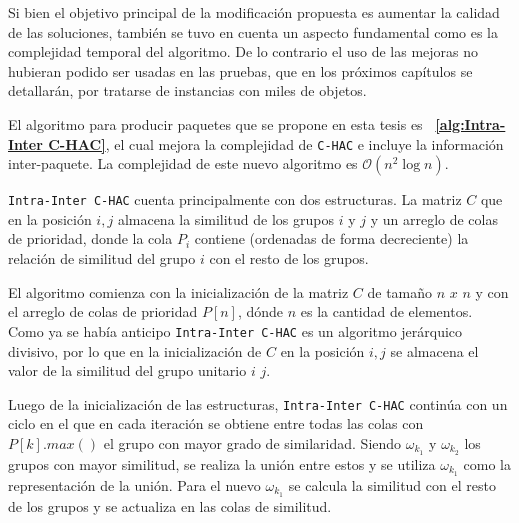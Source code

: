 Si bien el objetivo principal de la modificación propuesta es aumentar la calidad de las soluciones, también se tuvo en cuenta un aspecto fundamental como es la complejidad temporal del algoritmo. De lo contrario el uso de las mejoras no hubieran podido ser usadas en las pruebas, que en los próximos capítulos se detallarán, por tratarse de instancias con miles de objetos.

El algoritmo para producir paquetes que se propone en esta tesis es \textbf{~\autoref{alg:Intra-Inter C-HAC}}, el cual mejora la complejidad de  \texttt{C-HAC} e incluye la información inter-paquete. La complejidad de este nuevo algoritmo es $\mathcal{O}(n^{2}\log n)$. 

\texttt{Intra-Inter C-HAC} cuenta principalmente con dos estructuras. La matriz $C$ que en la posición $i,j$ almacena la similitud de los grupos $i$ y $j$ y un arreglo de colas de prioridad, donde la cola $P_i$ contiene (ordenadas de forma decreciente) la relación de similitud del grupo $i$ con el resto de los grupos.

El algoritmo comienza con la inicialización de la matriz $C$ de tamaño $n$ $x$ $n$ y con el arreglo de colas de prioridad $P\left[n\right]$, dónde $n$ es la cantidad de elementos. Como ya se había anticipo \texttt{Intra-Inter C-HAC} es un algoritmo jerárquico divisivo, por lo que en la inicialización de $C$ en la posición $i,j$ se almacena el valor de la similitud del grupo unitario $i$ $j$.

Luego de la inicialización de las estructuras, \texttt{Intra-Inter C-HAC} continúa con un ciclo en el que en cada iteración se obtiene entre todas las colas con $P\left[k\right].max()$ el grupo con mayor grado de similaridad. Siendo $\omega_{k_{1}}$ y $\omega_{k_{2}}$ los grupos con mayor similitud, se realiza la unión entre estos y se utiliza $\omega_{k_{1}}$  como la representación de la unión. Para el nuevo  $\omega_{k_{1}}$ se calcula la similitud con el resto de los grupos y se actualiza en las colas de similitud.

